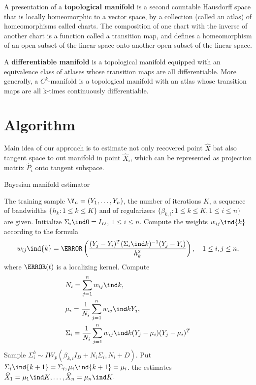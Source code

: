 \documentclass[tablecaption=bottom,wcp]{jmlr} %
\begin{document}
A presentation of a \textbf{topological manifold} is a second countable Hausdorff space that is locally homeomorphic to a vector space, by a collection (called an atlas) of homeomorphisms called charts. The composition of one chart with the inverse of another chart is a function called a transition map, and defines a homeomorphism of an open subset of the linear space onto another open subset of the linear space.

A \textbf{differentiable manifold} is a topological manifold equipped with an equivalence class of atlases whose transition maps are all differentiable. More generally, a $C^k$-manifold is a topological manifold with an atlas whose transition maps are all k-times continuously differentiable.



\section{Algorithm}

Main idea of our approach is to estimate not only recovered point $\hat X$ bat also tangent space to out manifold in point $\hat X_i$, which can be represented as projection matrix $\hat P_i$ onto tangent subspace.

\begin{algorithm}[H]
	\caption{Bayesian manifold estimator}
	\label{algorithm}
	\begin{algorithmic}[1]
		\State The training sample $\Y_n = (Y_1, \dots, Y_n)$, the number of iterations 
		$K$, a sequence of bandwidths $\{h_k : 1 \leq k \leq K\}$ 
		and of regularizers $\{\beta_{k, i} : 1 \leq k \leq K, 1 \leq i \leq n\}$ are given.
		\State Initialize $\Sigma_i\ind 0 = I_D$, $1 \leq i \leq n$.
		\State Compute the weights \( w_{ij}\ind{k} \) according to the formula
		\[
			w_{ij}\ind{k} = \K \left( \frac{(Y_j - Y_i)^T(\Sigma_i\ind k)^{-1}(Y_j - 
			Y_i)}{h_k^2} \right), \quad 1 \leq i, j \leq n,
		\]
		where $\K(t)$ is a localizing kernel.
		\State Compute
		\begin{align*}
			&
			N_i = \sum\limits_{j=1}^n w_{ij}\ind k,
			\\&
			\mu_i = \frac1{N_i} \sum\limits_{j=1}^n w_{ij}\ind k Y_j,
			\\&
			\Sigma_i = \frac1{N_i} \sum\limits_{j=1}^n w_{ij}\ind k (Y_j - \mu_i)(Y_j - 
			\mu_i)^T
		\end{align*}
		\State Sample $\Sigma_i^b \sim IW_p(\beta_{k, i} I_D + N_i \Sigma_i, N_i + D)$.
		\State Put $\Sigma_i\ind{k+1} = \Sigma_i, \mu_i\ind{k+1} = \mu_i$.
		\EndFor
		\Return the estimates \( \widehat{X}_1 = \mu_1\ind K, \dots, 
		\widehat{X}_n = \mu_n\ind K \).
	\end{algorithmic}
\end{algorithm}
\end{document}
